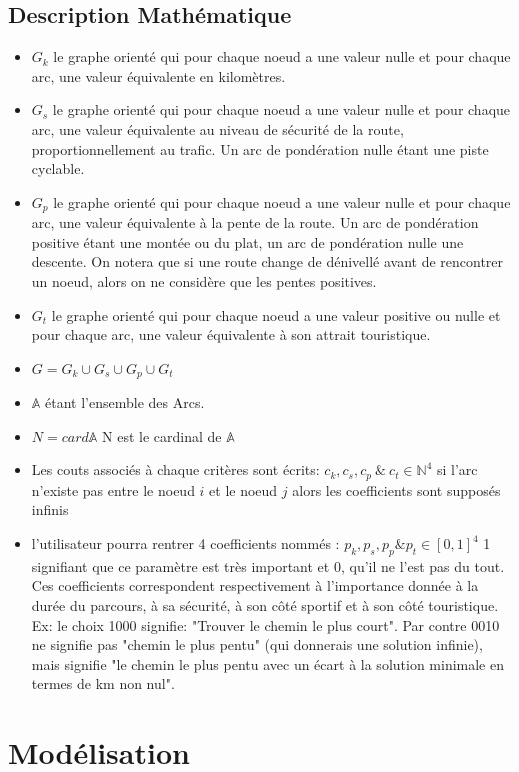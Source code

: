 \subsection{Description Mathématique}
\begin{itemize}
\item $G_{k}$ le graphe orienté qui pour chaque noeud a une valeur nulle et pour chaque arc, une valeur équivalente en kilomètres.
\item $G_{s}$ le graphe orienté qui pour chaque noeud a une valeur nulle et pour chaque arc, une valeur équivalente au niveau de sécurité de la route, proportionnellement au trafic. Un arc de pondération nulle étant une piste cyclable.
\item $G_{p}$ le graphe orienté qui pour chaque noeud a une valeur nulle et pour chaque arc, une valeur équivalente à la pente de la route. Un arc de pondération positive étant une montée ou du plat, un arc de pondération nulle une descente. On notera que si une route change de dénivellé avant de rencontrer un noeud, alors on ne considère que les pentes positives.
\item $G_{t}$ le graphe orienté qui pour chaque noeud a une valeur positive ou nulle et pour chaque arc, une valeur équivalente à son attrait touristique.
\item $G = G_{k} \cup G_{s} \cup G_{p} \cup G_{t}$
\item $\mathbb{A}$ étant l'ensemble des Arcs.
\item $N = card \mathbb{A}$ N est le cardinal de $\mathbb{A}$
\item Les couts associés à chaque critères sont écrits: $c_k, c_s, c_p \ \& \ c_t \in \mathbb{N}^4$ si l'arc n'existe pas entre le noeud $i$ et le noeud $j$ alors les coefficients sont supposés infinis
\item l'utilisateur pourra rentrer 4 coefficients nommés : $p_k, p_s, p_p \& p_t \in [0,1]^4$ 1 signifiant que ce paramètre est très important et 0, qu'il ne l'est pas du tout. Ces coefficients correspondent respectivement à l'importance donnée à la durée du parcours, à sa sécurité, à son côté sportif et à son côté touristique. Ex: le choix 1000 signifie: "Trouver le chemin le plus court". Par contre 0010 ne signifie pas "chemin le plus pentu" (qui donnerais une solution infinie), mais signifie "le chemin le plus pentu avec un écart à la solution minimale en termes de km non nul".
\end{itemize}

\section{Modélisation}

